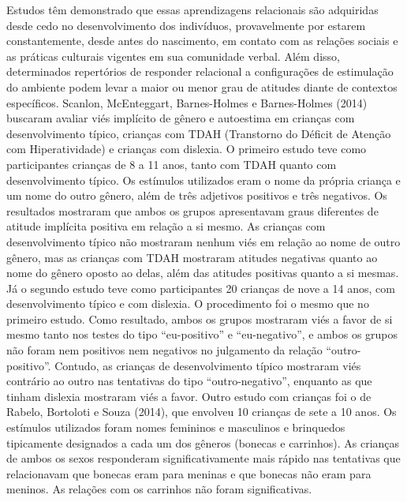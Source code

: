 Estudos têm demonstrado que essas aprendizagens relacionais são adquiridas desde cedo no desenvolvimento dos indivíduos, provavelmente por estarem constantemente, desde antes do nascimento, em contato com as relações sociais e as práticas culturais vigentes em sua comunidade verbal. Além disso, determinados repertórios de responder relacional a configurações de estimulação do ambiente podem levar a maior ou menor grau de atitudes diante de contextos específicos. Scanlon, McEnteggart, Barnes-Holmes e Barnes-Holmes (2014) buscaram avaliar viés implícito de gênero e autoestima em crianças com desenvolvimento típico, crianças com TDAH (Transtorno do Déficit de Atenção com Hiperatividade) e crianças com dislexia. O primeiro estudo teve como participantes crianças de 8 a 11 anos, tanto com TDAH quanto com desenvolvimento típico. Os estímulos utilizados eram o nome da própria criança e um nome do outro gênero, além de três adjetivos positivos e três negativos. Os resultados mostraram que ambos os grupos apresentavam graus diferentes de atitude implícita positiva em relação a si mesmo. As crianças com desenvolvimento típico não mostraram nenhum viés em relação ao nome de outro gênero, mas as crianças com TDAH mostraram atitudes negativas quanto ao nome do gênero oposto ao delas, além das atitudes positivas quanto a si mesmas. Já o segundo estudo teve como participantes 20 crianças de nove a 14 anos, com desenvolvimento típico e com dislexia. O procedimento foi o mesmo que no primeiro estudo. Como resultado, ambos os grupos mostraram viés a favor de si mesmo tanto nos testes do tipo ``eu-positivo'' e ``eu-negativo'', e ambos os grupos não foram nem positivos nem negativos no julgamento da relação ``outro-positivo''. Contudo, as crianças de desenvolvimento típico mostraram viés contrário ao outro nas tentativas do tipo ``outro-negativo'', enquanto as que tinham dislexia mostraram viés a favor. Outro estudo com crianças foi o de Rabelo, Bortoloti e Souza (2014), que envolveu 10 crianças de sete a 10 anos. Os estímulos utilizados foram nomes femininos e masculinos e brinquedos tipicamente designados a cada um dos gêneros (bonecas e carrinhos). As crianças de ambos os sexos responderam significativamente mais rápido nas tentativas que relacionavam que bonecas eram para meninas e que bonecas não eram para meninos. As relações com os carrinhos não foram significativas. 

